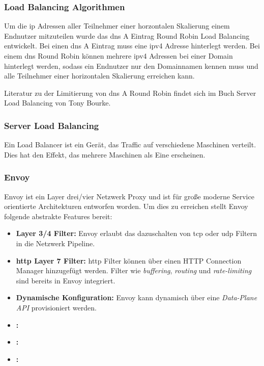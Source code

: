 \subsubsection{Load Balancing Algorithmen}

 \label{s:dns-round-robin}
Um die \ac{ip} Adressen aller Teilnehmer einer horzontalen Skalierung einem Endnutzer mitzuteilen wurde das \ac{dns} A Eintrag Round Robin Load Balancing entwickelt. Bei einen \ac{dns} A Eintrag muss eine \ac{ip}v4 Adresse hinterlegt werden. Bei einem \ac{dns} Round Robin können mehrere \ac{ip}v4 Adressen bei einer Domain hinterlegt werden, sodass ein Endnutzer nur den Domainnamen kennen muss und alle Teilnehmer einer horizontalen Skalierung erreichen kann.

Literatur zu der Limitierung von \ac{dns} A Round Robin findet sich im Buch Server Load Balancing von Tony Bourke.\cite{bourkeServerLoadBalancing2001}


\subsubsection{Server Load Balancing}
Ein Load Balancer ist ein Gerät, das Traffic auf verschiedene Maschinen verteilt. Dies hat den Effekt, das mehrere Maschinen als Eine erscheinen.
\cite{bourkeServerLoadBalancing2001}

\subsubsection{Envoy} \label{s:envoy}
Envoy ist ein Layer drei/vier Netzwerk Proxy und ist für gro{\ss}e moderne Service orientierte Architekturen entworfen worden. Um dies zu erreichen stellt Envoy folgende abstrakte Features bereit:
\begin{itemize}
    \item \textbf{Layer 3/4 Filter:} Envoy erlaubt das dazuschalten von \acs{tcp} oder \acs{udp} Filtern in die Netzwerk Pipeline.
    \item \textbf{\acs{http} Layer 7 Filter:} \acs{http} Filter können über einen HTTP Connection Manager hinzugefügt werden. Filter wie \textit{buffering}, \textit{routing} und \textit{rate-limiting} sind bereits in Envoy integriert.
    \item \textbf{Dynamische Konfiguration:} Envoy kann dynamisch über eine \textit{Data-Plane API} provisioniert werden.
    \item \textbf{:}
    \item \textbf{:}
    \item \textbf{:}
\end{itemize}
\cite{WhatEnvoyEnvoy}


